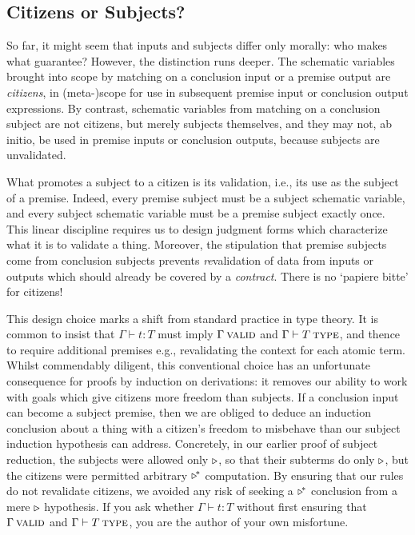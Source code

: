 \documentclass[format=acmsmall, screen, review, anonymous, timestamp]{acmart}
\begin{document}
\subsection{Citizens or Subjects?}

So far, it might seem that inputs and subjects differ only morally: who makes what guarantee? However, the distinction runs deeper. The schematic variables brought into scope by matching on a conclusion input or a premise output are \emph{citizens}, in (meta-)scope for use in subsequent premise input or conclusion output expressions. By contrast, schematic variables from matching on a conclusion subject are not citizens, but merely subjects themselves, and they may not, ab initio, be used in premise inputs or conclusion outputs, because subjects are unvalidated.

What promotes a subject to a citizen is its validation, i.e., its use as the subject of a premise. Indeed, every premise subject must be a subject schematic variable, and every subject schematic variable must be a premise subject exactly once. This linear discipline requires us to design judgment forms which characterize what it is to validate a thing. Moreover, the stipulation that premise subjects come from conclusion subjects prevents \emph{re}validation of data from inputs or outputs which should already be covered by a \emph{contract}. There is no `papiere bitte' for citizens!

This design choice marks a shift from standard practice in type theory. It is common to insist that $\Gamma\vdash t:T$ must imply $\Gamma\:\textsc{valid}$ and $\Gamma\vdash T\:\textsc{type}$, and thence to require additional premises e.g., revalidating the context for each atomic term. Whilst commendably diligent, this conventional choice has an unfortunate consequence for proofs by induction on derivations: it removes our ability to work with goals which give citizens more freedom than subjects. If a conclusion input can become a subject premise, then we are obliged to deduce an induction conclusion about a thing with a citizen's freedom to misbehave than our subject induction hypothesis can address. Concretely, in our earlier proof of subject reduction, the subjects were allowed only $\triangleright$, so that their subterms do only $\triangleright$, but the citizens were permitted arbitrary $\triangleright^{\!\ast}$ computation. By ensuring that our rules do not revalidate citizens, we avoided any risk of seeking a $\triangleright^{\!\ast}$ conclusion from a mere $\triangleright$ hypothesis. If you ask whether $\Gamma\vdash t:T$ without first ensuring that $\Gamma\:\textsc{valid}$ and $\Gamma\vdash T\:\textsc{type}$, you are the author of your own misfortune.
\end{document}
